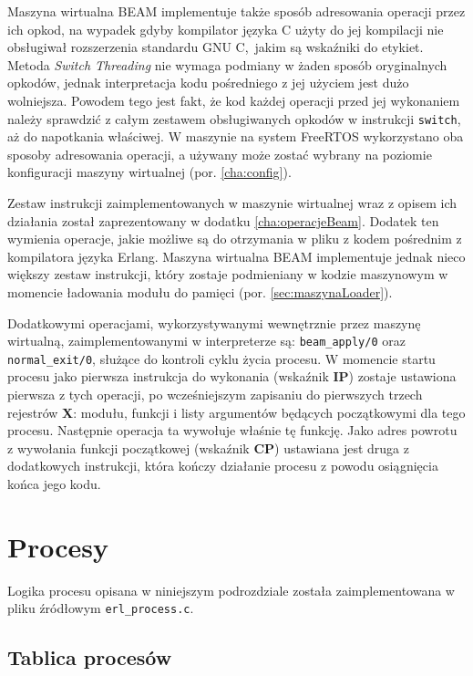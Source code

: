 Maszyna wirtualna BEAM implementuje także sposób adresowania operacji przez ich opkod, na wypadek gdyby kompilator języka C użyty do jej kompilacji nie obsługiwał rozszerzenia standardu GNU C,~jakim są wskaźniki do etykiet.
Metoda \emph{Switch Threading} nie wymaga podmiany w żaden sposób oryginalnych opkodów, jednak interpretacja kodu pośredniego z jej użyciem jest dużo wolniejsza.
Powodem tego jest fakt, że kod każdej operacji przed jej wykonaniem należy sprawdzić z całym zestawem obsługiwanych opkodów w instrukcji \texttt{switch}, aż do napotkania właściwej.
W maszynie na system FreeRTOS wykorzystano oba sposoby adresowania operacji, a używany może zostać wybrany na poziomie konfiguracji maszyny wirtualnej (por. \ref{cha:config}).

Zestaw instrukcji zaimplementowanych w maszynie wirtualnej wraz z opisem ich działania został zaprezentowany w dodatku \ref{cha:operacjeBeam}.
Dodatek ten wymienia operacje, jakie możliwe są do otrzymania w pliku z kodem pośrednim z kompilatora języka Erlang.
Maszyna wirtualna BEAM implementuje jednak nieco większy zestaw instrukcji, który zostaje podmieniany w kodzie maszynowym w momencie ładowania modułu do pamięci (por. \ref{sec:maszynaLoader}).

Dodatkowymi operacjami, wykorzystywanymi wewnętrznie przez maszynę wirtualną, zaimplementowanymi w interpreterze są: \texttt{beam\_apply/0} oraz \texttt{normal\_exit/0}, służące do kontroli cyklu życia procesu.
W momencie startu procesu jako pierwsza instrukcja do wykonania (wskaźnik \textbf{IP}) zostaje ustawiona pierwsza z tych operacji, po wcześniejszym zapisaniu do pierwszych trzech rejestrów \textbf{X}: modułu, funkcji i listy argumentów będących początkowymi dla tego procesu.
Następnie operacja ta wywołuje właśnie tę funkcję.
Jako adres powrotu z wywołania funkcji początkowej (wskaźnik \textbf{CP}) ustawiana jest druga z dodatkowych instrukcji, która kończy działanie procesu z powodu osiągnięcia końca jego kodu.

\section{Procesy}
\label{sec:maszynaProcesy}

Logika procesu opisana w niniejszym podrozdziale została zaimplementowana w pliku źródłowym \texttt{erl\_process.c}.

\subsection{Tablica procesów}
\label{sub:procTablica}

